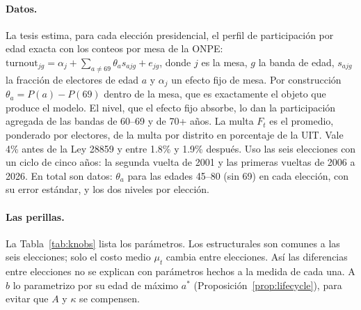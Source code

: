 \documentclass[11pt]{article}
\theoremstyle{definition}
\newcommand{\1}{\mathbbm{1}}
\begin{document}
\paragraph{Datos.} La tesis estima, para cada elección presidencial, el perfil de participación por
edad exacta con los conteos por mesa de la ONPE:
$\text{turnout}_{jg}=\alpha_j+\sum_{a\ne69}\theta_a s_{ajg}+e_{jg}$, donde $j$ es la mesa, $g$ la
banda de edad, $s_{ajg}$ la fracción de electores de edad $a$ y $\alpha_j$ un efecto fijo de mesa.
Por construcción $\theta_a=P(a)-P(69)$ dentro de la mesa, que es exactamente el objeto que produce
el modelo. El nivel, que el efecto fijo absorbe, lo dan la participación agregada de las bandas de
60--69 y de 70+ años. La multa $F_t$ es el promedio, ponderado por electores, de la multa por
distrito en porcentaje de la UIT. Vale 4\% antes de la Ley 28859 y entre 1.8\% y 1.9\% después.
Uso las seis elecciones con un ciclo de cinco años: la segunda vuelta de 2001 y las primeras
vueltas de 2006 a 2026. En total son \nMoments{} datos: $\theta_a$ para las edades 45--80 (sin 69)
en cada elección, con su error estándar, y los dos niveles por elección.

\paragraph{Las perillas.} La Tabla~\ref{tab:knobs} lista los parámetros. Los estructurales son
comunes a las seis elecciones; solo el costo medio $\mu_t$ cambia entre elecciones. Así las
diferencias entre elecciones no se explican con parámetros hechos a la medida de cada una. A $b$ lo
parametrizo por su edad de máximo $a^*$ (Proposición~\ref{prop:lifecycle}), para evitar que $A$ y
$\kappa$ se compensen.
\end{document}
